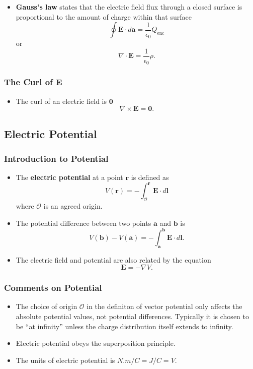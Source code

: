 \documentclass{article}
\renewcommand{\vec}[1]{\boldsymbol{\mathbf{#1}}}
\begin{document}
\begin{itemize}
  \item \textbf{Gauss's law} states that the electric field flux through a closed surface is proportional to the amount of charge within that surface \[\oint \vec{E} \cdot d \vec{a} = \frac{1}{\epsilon_0} Q_\text{enc}\] or \[\nabla \cdot \vec{E} = \frac{1}{\epsilon_0} \rho.\]
\end{itemize}

\setcounter{subsubsection}{3}
\subsubsection{The Curl of E}

\begin{itemize}
  \item The curl of an electric field is $\vec{0}$ \[\nabla \times \vec{E} = \vec{0}.\]
\end{itemize}

\subsection{Electric Potential}

\subsubsection{Introduction to Potential}

\begin{itemize}
  \item The \textbf{electric potential} at a point $\vec{r}$ is defined as \[V(\vec{r}) = -\int_\mathcal{O}^{\vec{r}} \vec{E} \cdot d \vec{l}\] where $\mathcal{O}$ is an agreed origin.

  \item The potential difference between two points $\vec{a}$ and $\vec{b}$ is \[V(\vec{b}) - V(\vec{a}) = -\int_{\vec{a}}^{\vec{b}} \vec{E} \cdot d \vec{l}.\]

  \item The electric field and potential are also related by the equation \[\vec{E} = -\nabla V.\]
\end{itemize}

\subsubsection{Comments on Potential}

\begin{itemize}
  \item The choice of origin $\mathcal{O}$ in the definiton of vector potential only affects the absolute potential values, not potential differences. Typically it is chosen to be ``at infinity'' unless the charge distribution itself extends to infinity.

  \item Electric potential obeys the superposition principle.

  \item The units of electric potential is $\unit{N.m/C} = \unit{J/C} = \unit{V}$.
\end{itemize}
\end{document}
